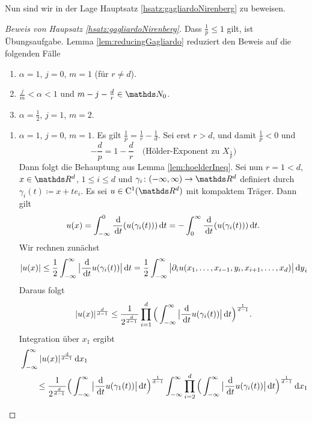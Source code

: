 Nun sind wir in der Lage Hauptsatz \ref{hsatz:gagliardoNirenberg} zu beweisen.

\begin{proof}[Beweis von Haupsatz \ref{hsatz:gagliardoNirenberg}]
  Dass $\frac{1}{p} \leq 1$ gilt, ist Übungsaufgabe.
  Lemma \ref{lem:reducingGagliardo} reduziert den Beweis auf die folgenden Fälle
  \begin{enumerate}
    \item $\alpha = 1$, $j = 0$, $m = 1$ (für $r \neq d$).
    \item $\frac{j}{m} < \alpha < 1$ und $m - j - \frac{d}{r} \in \N_0$.
    \item $\alpha = \frac{1}{2}$, $j = 1$, $m = 2$.
  \end{enumerate}

  \begin{enumerate}
    \item $\alpha = 1$, $j = 0$, $m = 1$.
      Es gilt $\frac{1}{p} = \frac{1}{r} - \frac{1}{d}$.
      Sei erst $r > d$, und damit $\frac{1}{p} < 0$ und
      $$
      -\frac{d}{p} = 1 - \frac{d}{r} \quad\text{(Hölder-Exponent zu $X_{\frac{1}{p}}$)}
      $$
      Dann folgt die Behauptung aus Lemma \ref{lem:hoelderIneq}.
      Sei nun $r = 1 < d$, $x \in \R^d$, $1 \leq i \leq d$ und $\gamma_i \colon (-\infty, \infty) \to \R^d$ definiert durch $\gamma_i (t) \coloneqq x + t e_i$.
      Es sei $u \in \CC^1(\R^d)$ mit kompaktem Träger. Dann gilt
      $$
      u(x) = \int_{-\infty}^0 \frac{\, {\operatorname{d}\!{}}}{\, {\operatorname{d}\!{t}}} (u(\gamma_i(t))) \, {\operatorname{d}\!{t}} = -\int_0^\infty \frac{\, {\operatorname{d}\!{}}}{\, {\operatorname{d}\!{t}}} (u(\gamma_i(t))) \, {\operatorname{d}\!{t}}.
      $$
      Wir rechnen zunächst
      $$
      |u(x)| \leq \frac{1}{2} \int_{-\infty}^\infty \big| \frac{\, {\operatorname{d}\!{}}}{\, {\operatorname{d}\!{t}}} u(\gamma_i(t)) \big| \, {\operatorname{d}\!{t}} = \frac{1}{2} \int_{-\infty}^\infty \big| \partial_i u(x_1,\dots,x_{i - 1},y_i,x_{i + 1}, \dots,x_d) \big| \, {\operatorname{d}\!{y}}_i
      $$
      Daraus folgt
      $$
      |u(x)|^{\frac{d}{d - 1}} \leq \frac{1}{2^{\frac{d}{d - 1}}} \prod_{i = 1}^d \Big( \int_{-\infty}^\infty \big| \frac{\, {\operatorname{d}\!{}}}{\, {\operatorname{d}\!{t}}} u(\gamma_i(t)) \big| \, {\operatorname{d}\!{t}} \Big)^{\frac{1}{d - 1}}.
      $$
      Integration über $x_1$ ergibt
      \begin{align*}
        &\int_{-\infty}^\infty |u(x)|^{\frac{\d{}}{d - 1}} \d x_1  \\
        &\qquad \leq \frac{1}{2^{\frac{d}{d - 1}}} \Big( \int_{-\infty}^\infty \big| \frac{\d{}}{\d t} u(\gamma_1(t)) \big| \d t \Big)^{\frac{1}{d - 1}} \int_{-\infty}^\infty \prod_{i = 2}^d \Big(\int_{-\infty}^\infty  \big| \frac{\d{}}{\d t} u(\gamma_i(t)) \big| \d t \Big)^{\frac{1}{d - 1}} \d x_1 \\

\end{align*}
\end{enumerate}
\end{proof}
